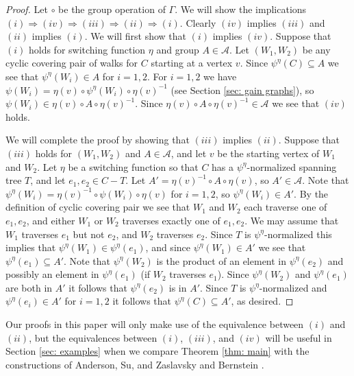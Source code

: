 \documentclass[12pt]{article}
\theoremstyle{definition}
\newcommand{\cA}{\mathcal{A}}
\begin{document}
\begin{proof}
Let $\circ$ be the group operation of $\Gamma$.
We will show the implications $(i) \Rightarrow (iv) \Rightarrow (iii) \Rightarrow (ii) \Rightarrow (i)$.
Clearly $(iv)$ implies $(iii)$ and $(ii)$ implies $(i)$.
We will first show that $(i)$ implies $(iv)$.
Suppose that $(i)$ holds for switching function $\eta$ and group $A \in \cA$.
Let $(W_1, W_2)$ be any cyclic covering pair of walks for $C$ starting at a vertex $v$.
Since $\psi^{\eta}(C) \subseteq A$ we see that $\psi^{\eta}(W_i) \in A$ for $i = 1,2$.
For $i = 1,2$ we have $\psi(W_i) = \eta(v) \circ \psi^{\eta}(W_i) \circ \eta(v)^{-1}$ (see Section \ref{sec: gain graphs}), so $\psi(W_i) \in \eta(v) \circ A \circ \eta(v)^{-1}$.
Since $\eta(v) \circ A \circ \eta(v)^{-1} \in \cA$ we see that $(iv)$ holds.

We will complete the proof by showing that $(iii)$ implies $(ii)$.
Suppose that $(iii)$ holds for $(W_1, W_2)$ and $A \in \cA$, and let $v$ be the starting vertex of $W_1$ and $W_2$.
Let $\eta$ be a switching function so that $C$ has a $\psi^{\eta}$-normalized spanning tree $T$, and let $e_1,e_2 \in C - T$.
Let $A' = \eta(v)^{-1} \circ A \circ \eta(v)$, so $A' \in \cA$.
Note that $\psi^{\eta}(W_i) = \eta(v)^{-1}\circ \psi(W_i) \circ \eta(v)$ for $i = 1,2$, so $\psi^{\eta}(W_i) \in A'$.
By the definition of cyclic covering pair we see that $W_1$ and $W_2$ each traverse one of $e_1, e_2$, and either $W_1$ or $W_2$ traverses exactly one of $e_1, e_2$.
We may assume that $W_1$ traverses $e_1$ but not $e_2$, and $W_2$ traverses $e_2$.
Since $T$ is $\psi^{\eta}$-normalized this implies that $\psi^{\eta}(W_1) \in \psi^{\eta}(e_1)$, and since $\psi^{\eta}(W_1) \in A'$ we see that $\psi^{\eta}(e_1) \subseteq A'$.
Note that $\psi^{\eta}(W_2)$ is the product of an element in $\psi^{\eta}(e_2)$ and possibly an element in $\psi^{\eta}(e_1)$ (if $W_2$ traverses $e_1$).
Since $\psi^{\eta}(W_2)$ and $\psi^{\eta}(e_1)$ are both in $A'$ it follows that $\psi^{\eta}(e_2)$ is in $A'$.
Since $T$ is $\psi^{\eta}$-normalized and $\psi^{\eta}(e_i)\in A'$ for $i = 1,2$ it follows that $\psi^{\eta}(C) \subseteq A'$, as desired.
\end{proof}


Our proofs in this paper will only make use of the equivalence between $(i)$ and $(ii)$, but the equivalences between $(i)$, $(iii)$, and $(iv)$ will be useful in Section \ref{sec: examples} when we compare Theorem \ref{thm: main} with the constructions of Anderson, Su, and Zaslavsky \cite{Anderson-Su-Zaslavsky2024} and Bernstein \cite{Bernstein2022}.
\end{document}
